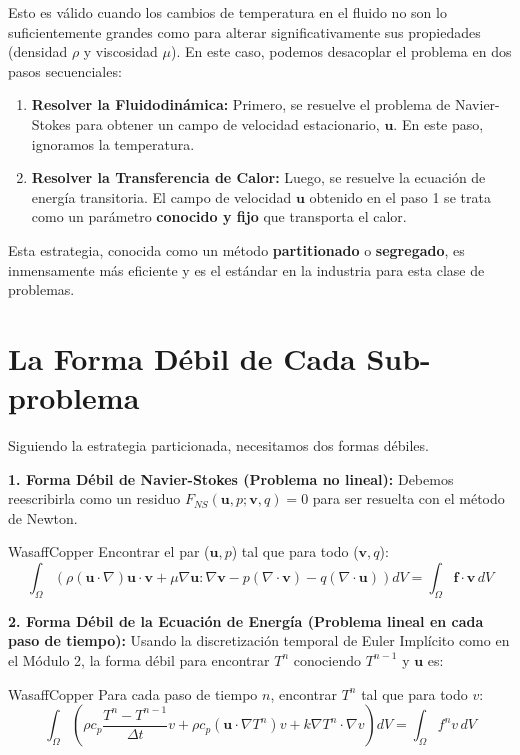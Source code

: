 Esto es válido cuando los cambios de temperatura en el fluido no son lo suficientemente grandes como para alterar significativamente sus propiedades (densidad $\rho$ y viscosidad $\mu$). En este caso, podemos desacoplar el problema en dos pasos secuenciales:

\begin{enumerate}
    \item \textbf{Resolver la Fluidodinámica:} Primero, se resuelve el problema de Navier-Stokes para obtener un campo de velocidad estacionario, $\mathbf{u}$. En este paso, ignoramos la temperatura.
    \item \textbf{Resolver la Transferencia de Calor:} Luego, se resuelve la ecuación de energía transitoria. El campo de velocidad $\mathbf{u}$ obtenido en el paso 1 se trata como un parámetro \textbf{conocido y fijo} que transporta el calor.
\end{enumerate}
Esta estrategia, conocida como un método \textbf{partitionado} o \textbf{segregado}, es inmensamente más eficiente y es el estándar en la industria para esta clase de problemas.

\section{La Forma Débil de Cada Sub-problema}
Siguiendo la estrategia particionada, necesitamos dos formas débiles.

\textbf{1. Forma Débil de Navier-Stokes (Problema no lineal):}
Debemos reescribirla como un residuo $F_{NS}(\mathbf{u}, p; \mathbf{v}, q)=0$ para ser resuelta con el método de Newton.
\begin{keybox}{WasaffCopper}
    Encontrar el par ($\mathbf{u}, p$) tal que para todo ($\mathbf{v}, q$):
    $$ \int_{\Omega} \left( \rho (\mathbf{u} \cdot \nabla) \mathbf{u} \cdot \mathbf{v} + \mu \nabla\mathbf{u} : \nabla\mathbf{v} - p (\nabla \cdot \mathbf{v}) - q (\nabla \cdot \mathbf{u}) \right) dV = \int_{\Omega} \mathbf{f} \cdot \mathbf{v} \, dV $$
\end{keybox}

\textbf{2. Forma Débil de la Ecuación de Energía (Problema lineal en cada paso de tiempo):}
Usando la discretización temporal de Euler Implícito como en el Módulo 2, la forma débil para encontrar $T^n$ conociendo $T^{n-1}$ y $\mathbf{u}$ es:
\begin{keybox}{WasaffCopper}
    Para cada paso de tiempo $n$, encontrar $T^n$ tal que para todo $v$:
    $$ \int_{\Omega} \left( \rho c_p \frac{T^n - T^{n-1}}{\Delta t} v + \rho c_p (\mathbf{u} \cdot \nabla T^n) v + k \nabla T^n \cdot \nabla v \right) dV = \int_{\Omega} f^n v \, dV $$
\end{keybox}

